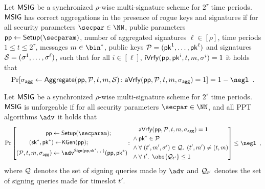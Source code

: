 \begin{definition}
  Let $\mathsf{MSIG}$ be a synchronized $\rho$-wise multi-signature scheme for $2^\tau$ time periods.
  $\mathsf{MSIG}$ has correct aggregations in the presence of rogue keys and signatures if for all security parameters $\secpar\in\NN$, public parameters $\params\gets\setup(\secparam)$, number of aggregated signatures $\ell\in[\rho]$, time periods $1\leq t \leq 2^\tau$, messages $m\in\bin^*$, public keys $\mathcal{P} = (\mathsf{pk}^1,\dots,\mathsf{pk}^\ell)$ and signatures $\mathcal{S} = (\sigma^1,\dots,\sigma^\ell)$, such that for all $i\in[\ell]$, $\mathsf{iVrfy}(\mathsf{pp},\mathsf{pk}^i,t,m,\sigma^i) = 1$ it holds that
  \[
    \Pr[\aggsig\gets\aggregate(\params,\pubkeys,t,m,\signatures)\colon \averify(\params,\pubkeys,t,m,\aggsig)=1]=1-\negl\enspace.
  \]
\end{definition}

\begin{definition}[Unforgeability]\label{def:multisigunforge}
  Let $\mathsf{MSIG}$ be a synchronized $\rho$-wise multi-signature scheme for $2^\tau$ time periods.
  $\mathsf{MSIG}$ is unforgeable if for all security parameters $\secpar\in\NN$, and all PPT algorithms $\adv$ it holds that
\[
  \Pr\left[\begin{aligned}
  \params\gets{}&\setup(\secparam);\\
  (\sk^*,\pk^*)\gets&\kgen(\params);\\
  (\pubkeys,t,m,\aggsig)\gets{}&\adv^{\sign(\params,\sk^*,\cdot,\cdot)}(\params,\pk^*)
  \end{aligned}\colon
  \begin{aligned}
  &\averify(\params,\pubkeys,t,m,\aggsig)=1\\
  {}\land{}&\pk^*\in\pubkeys\\
  {}\land{}&\forall\; (t',m',\sigma') \in\queries\ldotp\; (t',m') \neq (t,m)\\
  {}\land{}&\forall\; t' \ldotp\;\abs{\queries_{t'}}\leq 1
  \end{aligned}\right] \leq \negl\enspace,
\]
where $\mathcal{Q}$ denotes the set of signing queries made by $\adv$ and $\mathcal{Q}_{t'}$ denotes the set of signing queries made for timeslot $t'$.
\end{definition}

